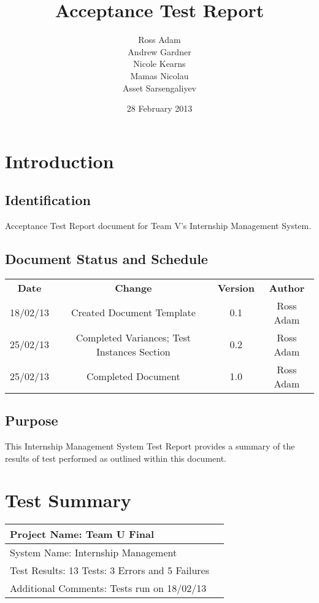 \documentclass{l3deliverable}
\title{Acceptance Test Report}
\author{
  Ross Adam \\
  Andrew Gardner \\
  Nicole Kearns \\
  Mamas Nicolau \\
  Asset Sarsengaliyev \\
  }
\date{28 February 2013}
\begin{document}
\maketitle
\tableofcontents
\newpage
\section{Introduction}
\subsection{Identification}
Acceptance Test Report document for Team V's Internship Management System.
\subsection{Document Status and Schedule}
\begin{center}{
\begin{tabular}{|c|c|c|c|}
\hline \textbf{Date} &\textbf{Change} & \textbf{Version} & \textbf{Author}\\ 
18/02/13 & Created Document Template & 0.1 & Ross Adam\\
25/02/13 & Completed Variances; Test Instances Section & 0.2 & Ross Adam\\
25/02/13 & Completed Document & 1.0 & Ross Adam\\
\hline 
\end{tabular} }
\end{center}

\subsection{Purpose}
This Internship Management System Test Report provides a summary of the results of test performed as outlined within this document.

\section{Test Summary}

\begin{tabular}{|l|l|}
\hline
Project Name: Team U Final & \\
\hline
System Name: Internship Management &\\
\hline
Test Results: 13 Tests: 3 Errors and 5 Failures &\\
\hline
Additional Comments: Tests run on 18/02/13 &\\
\hline
\end{tabular}
\end{document}
